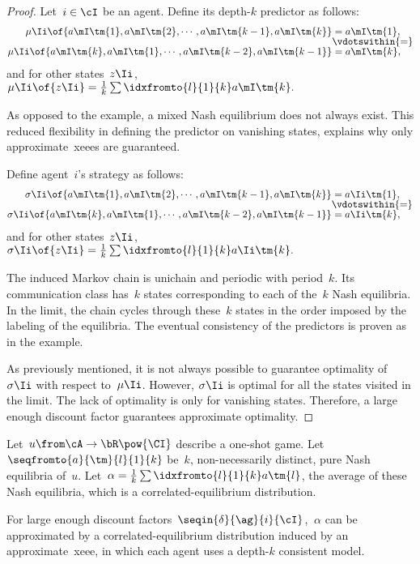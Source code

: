 \begin{proof}
Let~\(i \in \cI\) be an agent.
Define its depth-\(k\) predictor as follows:
\[
\begin{aligned}
\mu\Ii \of {a\mI\tm{1}, a\mI\tm{2}, \cdots, a\mI\tm{k - 1}, a\mI\tm{k}} & = a\mI\tm{1}, \\[-5pt]
&\vdotswithin{=} \\[-5pt]
\mu\Ii \of {a\mI\tm{k}, a\mI\tm{1}, \cdots, a\mI\tm{k - 2}, a\mI\tm{k - 1}} & = a\mI\tm{k},
\end{aligned}
\]
and for other states~\(z\Ii\),
\(
\mu\Ii \of {z\Ii} = \frac{1}{k} \sum\idxfromto{l}{1}{k} a\mI\tm{k}.
\)

As opposed to the example, a mixed Nash equilibrium does not always exist.
This reduced flexibility in defining the predictor on vanishing states, explains why only approximate~\acp{xeee} are guaranteed.

Define agent~\(i\)'s strategy as follows:
\[
\begin{aligned}
\sigma\Ii \of {a\mI\tm{1}, a\mI\tm{2}, \cdots, a\mI\tm{k - 1}, a\mI\tm{k}} &= a\Ii\tm{1}, \\[-5pt]
&\vdotswithin{=} \\[-5pt]
\sigma\Ii \of {a\mI\tm{k}, a\mI\tm{1}, \cdots, a\mI\tm{k - 2}, a\mI\tm{k - 1}} &= a\Ii\tm{k},
\end{aligned}
\]
and for other states~\(z\Ii\),
\(
\sigma\Ii \of {z\Ii} = \frac{1}{k} \sum\idxfromto{l}{1}{k} a\Ii\tm{k}.
\)

The induced Markov chain is unichain and periodic with period~\(k\).
Its communication class has~\(k\) states corresponding to each of the~\(k\) Nash equilibria.
In the limit, the chain cycles through these~\(k\) states in the order imposed by the labeling of the equilibria.
The eventual consistency of the predictors is proven as in the example.

As previously mentioned, it is not always possible to guarantee optimality of~\(\sigma\Ii\) with respect to~\(\mu\Ii\).
However, \(\sigma\Ii\) is optimal for all the states visited in the limit.
The lack of optimality is only for vanishing states.
Therefore, a large enough discount factor guarantees approximate optimality.
\end{proof}

\begin{corollary}
Let~\(u \from \cA \to \bR\pow{\CI}\) describe a one-shot game.
Let~\(\seqfromto{a}{\tm}{l}{1}{k}\) be~\(k\), non-necessarily distinct, pure Nash equilibria of~\(u\).
Let~\(\alpha = \frac{1}{k} \sum\idxfromto{l}{1}{k} a\tm{l}\), the average of these Nash equilibria, which is a correlated-equilibrium distribution.

For large enough discount factors~\(\seqin{\delta}{\ag}{i}{\cI}\), \(~\alpha\) can be approximated by a correlated-equilibrium distribution induced by an approximate~\ac{xeee}, in which each agent uses a depth-\(k\) consistent model.
\end{corollary}

